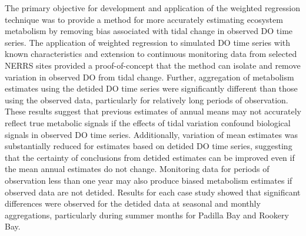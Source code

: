 \documentclass[letterpaper,12pt,oneside]{article}\usepackage[]{graphicx}\usepackage[]{color}
\begin{document}
The primary objective for development and application of the weighted regression technique was to provide a method for more accurately estimating ecosystem metabolism by removing bias associated with tidal change in observed \ac{DO} time series.  The application of weighted regression to simulated \ac{DO} time series with known characteristics and extension to continuous monitoring data from selected \ac{NERRS} sites provided a proof-of-concept that the method can isolate and remove variation in observed \ac{DO} from tidal change.  Further, aggregation of metabolism estimates using the detided \ac{DO} time series were significantly different than those using the observed data, particularly for relatively long periods of observation. These results suggest that previous estimates of annual means may not accurately reflect true metabolic signals if the effects of tidal variation confound biological signals in observed \ac{DO} time series.  Additionally, variation of mean estimates was substantially reduced for estimates based on detided \ac{DO} time series, suggesting that the certainty of conclusions from detided estimates can be improved even if the mean annual estimates do not change.  Monitoring data for periods of observation less than one year may also produce biased metabolism estimates if observed data are not detided.  Results for each case study showed that significant differences were observed for the detided data at seasonal and monthly aggregations, particularly during summer months for Padilla Bay and Rookery Bay.  
\end{document}
